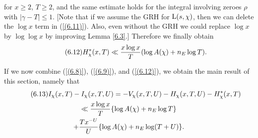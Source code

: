 \documentclass[./main]{subfiles}
\begin{document}
for $x \geq 2$, $T \geq 2$, and the same estimate holds for the integral involving zeroes $\rho$ with $|\gamma - T| \leq 1$. [Note that if we assume the GRH for $\operatorname{L}(s, \chi)$, then we can delete the $\log x$ term in (\ref{(6.11)}). Also, even without the GRH we could replace $\log x$ by $\log \log x$  by improving Lemma \ref{6.3}.] Therefore we finally obtain 
\[\tag{6.12}\label{(6.12)} H_{\chi}^{*}(x,T) \ll \frac{x \log x}{T}(\log A(\chi) + n_E \log T).
\]

If we now combine (\ref{(6.8)}), (\ref{(6.9)}), and (\ref{(6.12)}), we obtain the main result of this section, namely that 
\begin{multline}\tag{6.13}\label{(6.13)}
    I_{\chi}(x,T) - I_{\chi}(x,T,U) = -V_{\chi}(x,T,U) - H_{\chi}(x,T,U) - H_{\chi}^{*}(x,T)\\ \ll \frac{x\log x}{T}\{\log A(\chi) + n_E \log T\}\\ + \frac{Tx^{-U}}{U} \{\log A(\chi) + n_E \log(T+U)\}.
\end{multline}
\end{document}
